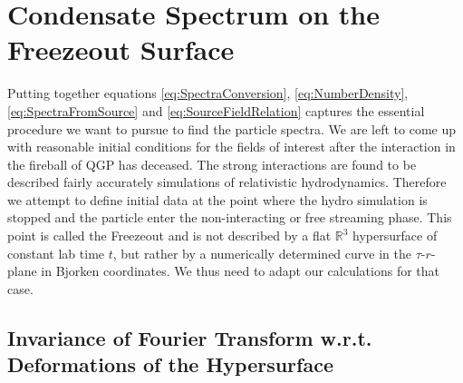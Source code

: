 \chapter{Condensate Spectrum on the Freezeout Surface}

Putting together equations \eqref{eq:SpectraConversion}, \eqref{eq:NumberDensity}, \eqref{eq:SpectraFromSource} and \eqref{eq:SourceFieldRelation} captures the essential procedure we want to pursue to find the particle spectra. We are left to come up with reasonable initial conditions for the fields of interest after the interaction in the fireball of QGP has deceased. The strong interactions are found to be described fairly accurately simulations of relativistic hydrodynamics. Therefore we attempt to define initial data at the point where the hydro simulation is stopped and the particle enter the non-interacting or free streaming phase. This point is called the Freezeout and is not described by a flat $\mathbb{R}^3$ hypersurface of constant lab time $t$, but rather by a numerically determined curve in the $\tau$-$r$-plane in Bjorken coordinates. We thus need to adapt our calculations for that case. 

\section{Invariance of Fourier Transform w.r.t. Deformations of the Hypersurface}
\label{subsec:FourierDeformHypersurface}

